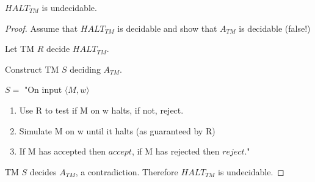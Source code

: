 \begin{theorem}
    \(HALT_{TM}\) is undecidable. 
\end{theorem}
\begin{proof}
    Assume that \(HALT_{TM}\) is decidable and show that \(A_{TM}\) is decidable (false!)  

    Let TM \(R\) decide \(HALT_{TM}\).
    
    Construct TM \(S\) deciding \(A_{TM}\).  

    \(S = \) "On input \(\langle M, w \rangle\) 
        \begin{enumerate}
            \item Use R to test if M on w halts, if not, reject.
            \item Simulate M on w until it halts (as guaranteed by R)
            \item If M has accepted then \(accept\), if M has rejected then \(reject\)."
        \end{enumerate} 

    TM \(S\) decides \(A_{TM}\), a contradiction. Therefore \(HALT_{TM}\) is undecidable.   
\end{proof}


